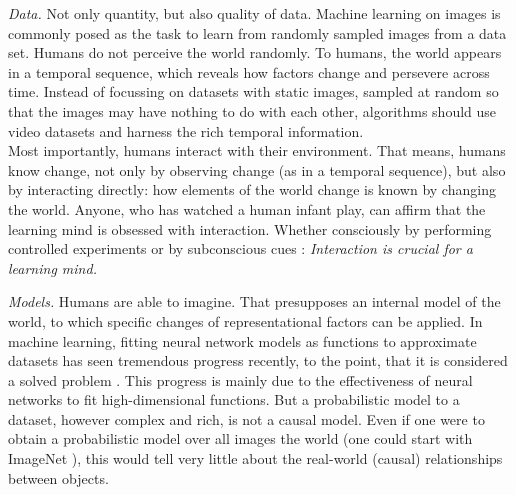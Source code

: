 	\emph{Data.}
		Not only quantity, but also quality of data. Machine learning on images is commonly posed as the task to learn from randomly sampled images from a data set. Humans do not perceive the world randomly.
		To humans, the world appears in a temporal sequence, which reveals how factors change and persevere across time. Instead of focussing on datasets with static images, sampled at random so that the images may have nothing to do with each other, algorithms should use video datasets and harness the rich temporal information.\\
		Most importantly, humans interact with their environment.
		That means, humans know change, not only by observing change (as in a temporal sequence), but also by interacting directly: how elements of the world change is known by changing the world.
		Anyone, who has watched a human infant play, can affirm that the learning mind is obsessed with interaction.
		Whether consciously by performing controlled experiments or by subconscious cues : \textit{Interaction is crucial for a learning mind.}


	\emph{Models.}
		Humans are able to imagine. That presupposes an internal model of the world, to which specific changes of representational factors can be applied.
		In machine learning, fitting neural network models as functions to approximate datasets has seen tremendous progress recently, to the point, that it is considered a solved problem . This progress is mainly due to the effectiveness of neural networks to fit high-dimensional functions. But a probabilistic model to a dataset, however complex and rich, is not a causal model. Even if one were to obtain a probabilistic model over all images the world (one could start with \eg ImageNet ), this would tell very little about the real-world (causal) relationships between objects.

